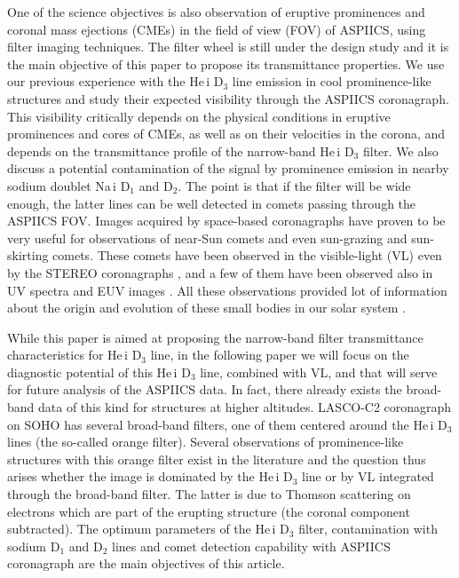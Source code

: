 \documentclass[namedreferences]{solarphysics}
\begin{document}
\begin{article}
One of the science objectives is also observation of eruptive prominences and coronal mass ejections (CMEs) in the field of
view (FOV) of ASPIICS, using filter imaging techniques. The filter wheel is still under the design study and it is the main objective of this
paper to propose its transmittance properties. We use our previous experience with the He\,{\sc i} D$_3$ line emission
in cool prominence-like structures \cite{Lab15} and study their expected visibility through the ASPIICS coronagraph.
This visibility critically depends on the physical conditions in eruptive prominences and cores
of CMEs, as well as on their velocities in the corona, and depends on the transmittance profile of the
narrow-band He\,{\sc i} D$_3$ filter. We also discuss a potential contamination of the signal by prominence
emission in nearby sodium doublet Na{\,\sc i} D$_1$ and D$_2$. The point is that if the filter will be wide
enough, the latter lines can be well detected in comets passing through the ASPIICS FOV. 
Images acquired by space-based coronagraphs have proven to be very useful for observations of near-Sun comets and even sun-grazing \cite{Bie02}
and sun-skirting \cite{Lam13} comets. These comets have been observed in the  visible-light (VL) even by the STEREO coronagraphs \cite{Tho09}, and a few of them have 
been observed also in UV spectra \cite{Bem07} and EUV images \cite{Mcc13}. All these observations provided lot of information about the origin 
and evolution of these small bodies in our solar system \cite{Sek03}.

While this paper is aimed at proposing the narrow-band filter transmittance characteristics for 
He\,{\sc i} D$_3$ line, in the
following paper we will focus on the diagnostic potential of this He\,{\sc i} D$_{3}$ line, combined with VL, 
and that will serve for future analysis of the ASPIICS data. In fact, there already exists the broad-band data of this kind for
structures at higher altitudes. LASCO-C2 coronagraph on SOHO has several broad-band filters, one
of them centered around the He\,{\sc i} D$_3$ lines (the so-called orange filter). Several observations
of prominence-like structures with this orange filter exist in the literature \cite{bou97} and
the question thus arises whether the image is dominated by the He\,{\sc i} D$_3$  line or by VL integrated through the broad-band
filter. The latter is due to Thomson scattering on electrons which are part of the erupting structure
(the coronal component subtracted). 
 The optimum parameters of the He\,{\sc i} D$_3$ filter, contamination with sodium D$_1$ and D$_2$ lines and comet detection capability with ASPIICS coronagraph are the main objectives of this article. 



\end{article}
\end{document}
